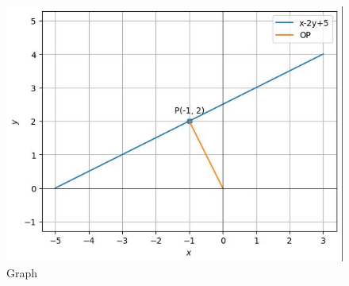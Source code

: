 \documentclass[12pt]{article}
\begin{document}
\begin{figure}[H]
  \centering
  \includegraphics[width=\columnwidth]{graph.jpg}
  \caption{Graph}
  \label{fig:pic}
\end{figure}
\end{document}
